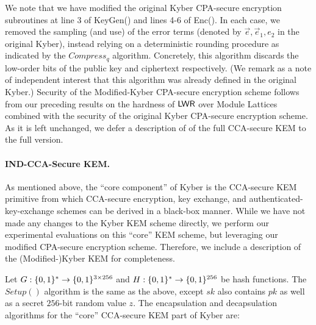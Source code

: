 We note that we have modified the original Kyber CPA-secure encryption subroutines at line 3 of KeyGen() and lines 4-6 of Enc(). In each case, we removed the sampling (and use) of the
error terms (denoted by $\vec{e}, \vec{e}_1, e_2$ in the original
Kyber), instead relying on a deterministic rounding procedure as
indicated by the $Compress_q$ algorithm. Concretely, this algorithm
discards the low-order bits of the public key and ciphertext
respectively. (We remark as a note of independent interest that this
algorithm was already defined in the original Kyber.) Security of the
Modified-Kyber CPA-secure encryption scheme follows from our preceding
results on the hardness of $\mathsf{LWR}$ over Module Lattices combined with
the security of the original Kyber CPA-secure encryption scheme. \iflncs
As it is left unchanged, we defer a description of of the full
CCA-secure KEM to the full version.
\else

\paragraph{IND-CCA-Secure KEM.} As mentioned above, the ``core component'' of Kyber is the CCA-secure KEM primitive from which CCA-secure encryption, key exchange, and authenticated-key-exchange schemes can be derived in a black-box manner. While we have not made any changes to the Kyber KEM scheme directly, we perform our experimental evaluations on this ``core'' KEM scheme, but leveraging our modified CPA-secure encryption scheme. Therefore, we include a description of the (Modified-)Kyber KEM for completeness.

Let $G: \{0,1\}^* \to \{0,1\}^{3\times 256}$ and $H: \{0,1\}^* \to \{0,1\}^{256}$ be hash functions. The $Setup()$ algorithm is the same as the above, except $sk$ also contains $pk$ as well as a secret $256$-bit random value $z$. The encapsulation and decapsulation algorithms for the ``core'' CCA-secure KEM part of Kyber are:

